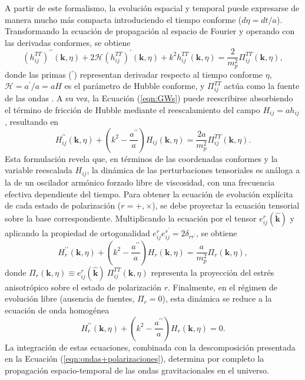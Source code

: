 A partir de este formalismo, la evolución espacial y temporal puede expresarse de manera mucho más compacta introduciendo el tiempo conforme ($d\eta = dt/a$). Transformando la ecuación de propagación al espacio de Fourier y operando con las derivadas conformes, se obtiene
\begin{equation}\label{eqn:GWs}
    \left( h^{TT}_{ij} \right)^{\prime \prime} \left( \textbf{k}, \eta \right) + 2 \mathcal{H} \left( h^{TT}_{ij} \right)^{\prime} \left( \textbf{k}, \eta \right) + k^2 h_{ij}^{TT} \left( \textbf{k}, \eta \right) = \frac{2}{m_p^2} \Pi_{ij}^{TT} \left( \textbf{k}, \eta \right),
\end{equation}
donde las primas ($^\prime$) representan derivadar respecto al tiempo conforme $\eta$, $\mathcal{H} = a^\prime/a = aH$ es el parámetro de Hubble conforme, y $\Pi_{ij}^{TT}$ actúa como la fuente de las ondas \cite{Figueroa_2017_GW}. A su vez, la Ecuación (\ref{eqn:GWs}) puede reescribirse absorbiendo el término de fricción de Hubble mediante el reescalamiento del campo $H_{ij} = a h_{ij}$, resultando en
\begin{equation}
    H_{ij}^{\prime \prime} \left( \textbf{k}, \eta \right) + \left( k^2 - \frac{a^{\prime \prime}}{a} \right) H_{ij} \left( \textbf{k}, \eta \right) = \frac{2 a}{m_p^2} \Pi_{ij}^{TT} \left( \textbf{k}, \eta \right).
\end{equation}
Esta formulación revela que, en términos de las coordenadas conformes y la variable reescalada $H_{ij}$, la dinámica de las perturbaciones tensoriales es análoga a la de un oscilador armónico forzado libre de viscosidad, con una frecuencia efectiva dependiente del tiempo. Para obtener la ecuación de evolución explícita de cada estado de polarización ($r = +, \times$), se debe proyectar la ecuación tensorial sobre la base correspondiente. Multiplicando la ecuación por el tensor $e_{ij}^r (\hat{\textbf{k}})$ y aplicando la propiedad de ortogonalidad $e_{ij}^r e_{ij}^{r^\prime} = 2 \delta_{rr^\prime}$, se obtiene
\begin{equation}
    H_{r}^{\prime \prime} \left( \textbf{k}, \eta \right) + \left( k^2 - \frac{a^{\prime \prime}}{a} \right) H_{r} \left( \textbf{k}, \eta \right) = \frac{a}{m_p^2} \Pi_{r} \left( \textbf{k}, \eta \right),
\end{equation}
donde $\Pi_r (\textbf{k}, \eta) \equiv e_{ij}^r (\hat{\textbf{k}}) ~ \Pi_{ij}^{TT} (\textbf{k}, \eta)$ representa la proyección del estrés anisotrópico sobre el estado de polarización $r$. Finalmente, en el régimen de evolución libre (ausencia de fuentes, $\Pi_r = 0$), esta dinámica se reduce a la ecuación de onda homogénea
\begin{equation}
    H_{r}^{\prime \prime} \left( \textbf{k}, \eta \right) + \left( k^2 - \frac{a^{\prime \prime}}{a} \right) H_{r} \left( \textbf{k}, \eta \right) = 0.
\end{equation}
La integración de estas ecuaciones, combinada con la descomposición presentada en la Ecuación (\ref{eqn:ondas+polarizaciones}), determina por completo la propagación espacio-temporal de las ondas gravitacionales en el universo.

